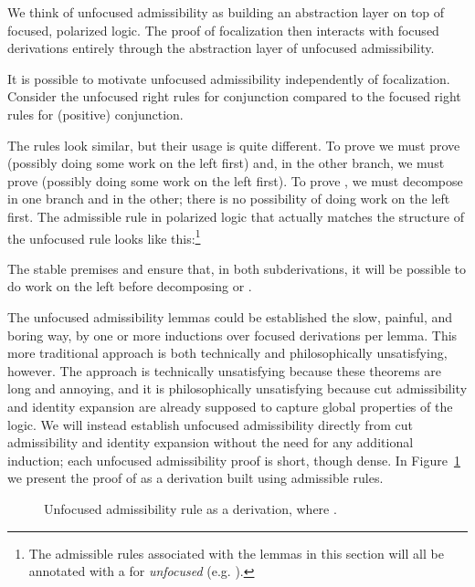 \documentclass[acmtocl]{robtrans}\pdfoutput=1
\begin{document}
We think of unfocused admissibility as building an
abstraction layer on top of focused, polarized logic.  The proof of
focalization then interacts with focused derivations entirely through
the abstraction layer of unfocused admissibility. 

It is possible to motivate unfocused admissibility independently of
focalization.  Consider the unfocused right rules for
conjunction compared to the focused right rules for (positive)
conjunction.

The rules look similar, but their usage is quite different. To prove
 we must prove  (possibly doing some work on the left first)
and, in the other branch, we must prove  (possibly doing some work on the
left first). To prove , we must 
decompose  in one branch and  in the other; there is no possibility
of doing work on the left first. The admissible rule in polarized
logic that actually matches the structure of the unfocused rule 
looks like this:\footnote{The admissible rules associated with 
the lemmas in this section will all be
annotated with a  for {\it unfocused} (e.g. ).}

The stable premises  and  ensure that, in both
subderivations, it will be possible to do work on the left before
decomposing  or . 

The unfocused admissibility lemmas could be established the slow,
painful, and boring way, by one or more inductions over focused
derivations per lemma.
This more traditional approach is
both technically and philosophically unsatisfying, however. The approach is
technically unsatisfying because these theorems are long and annoying,
and it is philosophically unsatisfying because cut admissibility and
identity expansion are already supposed to capture global properties
of the logic. We will instead establish unfocused admissibility
directly from cut admissibility and identity expansion without the
need for any additional induction; each unfocused
admissibility proof is short, though dense. In Figure~\ref{fig:adm} we
present the proof of  as a derivation built using
admissible rules.

\begin{figure}

\caption{Unfocused admissibility rule  as a derivation,
  where .}
\label{fig:adm}
\end{figure}
\end{document}
